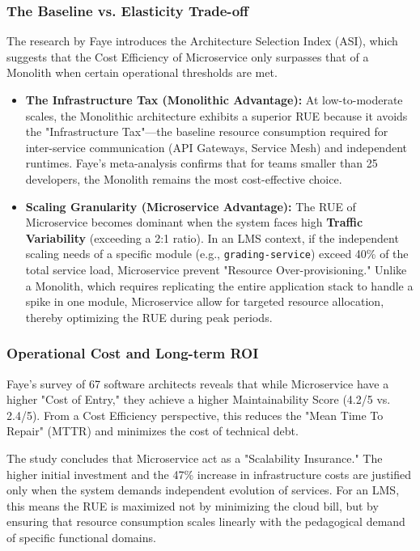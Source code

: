\subsubsection{The Baseline vs. Elasticity Trade-off}

The research by Faye introduces the Architecture Selection Index (ASI), which suggests that the Cost Efficiency of Microservice only surpasses that of a Monolith when certain operational thresholds are met.

\begin{itemize}
\item \textbf{The Infrastructure Tax (Monolithic Advantage):} At low-to-moderate scales, the Monolithic architecture exhibits a superior RUE because it avoids the "Infrastructure Tax"—the baseline resource consumption required for inter-service communication (API Gateways, Service Mesh) and independent runtimes. Faye's meta-analysis confirms that for teams smaller than 25 developers, the Monolith remains the most cost-effective choice.

\item \textbf{Scaling Granularity (Microservice Advantage):} The RUE of Microservice becomes dominant when the system faces high \textbf{Traffic Variability} (exceeding a 2:1 ratio). In an LMS context, if the independent scaling needs of a specific module (e.g., \texttt{grading-service}) exceed 40\% of the total service load, Microservice prevent "Resource Over-provisioning." Unlike a Monolith, which requires replicating the entire application stack to handle a spike in one module, Microservice allow for targeted resource allocation, thereby optimizing the RUE during peak periods.
\end{itemize}

\subsubsection{Operational Cost and Long-term ROI}

Faye’s survey of 67 software architects reveals that while Microservice have a higher "Cost of Entry," they achieve a 
higher Maintainability Score (4.2/5 vs. 2.4/5). From a Cost Efficiency perspective, this reduces 
the "Mean Time To Repair" (MTTR) and minimizes the cost of technical debt.

The study concludes that Microservice act as a "Scalability Insurance." The higher initial investment and the 47\% increase in infrastructure 
costs are justified only when the system demands independent evolution of services. For an LMS, this means the RUE is 
maximized not by minimizing the cloud bill, but by ensuring that resource consumption scales linearly with the pedagogical 
demand of specific functional domains.

